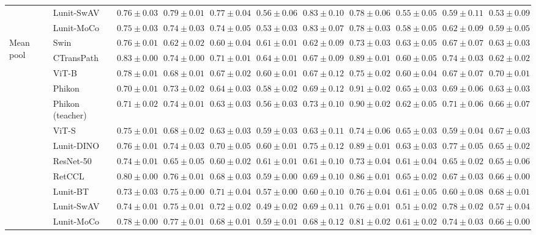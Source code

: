 \begin{tabular}{ll|cccc|c|cccc}
 & Lunit-SwAV & $0.76 \pm 0.03$ & $0.79 \pm 0.01$ & $0.77 \pm 0.04$ & $0.56 \pm 0.06$ & $0.83 \pm 0.10$ & $0.78 \pm 0.06$ & $0.55 \pm 0.05$ & $0.59 \pm 0.11$ & $0.53 \pm 0.09$ \\
 & Lunit-MoCo & $0.75 \pm 0.03$ & $0.74 \pm 0.03$ & $0.74 \pm 0.05$ & $0.53 \pm 0.03$ & $0.83 \pm 0.07$ & $0.78 \pm 0.03$ & $0.58 \pm 0.05$ & $0.62 \pm 0.09$ & $0.59 \pm 0.05$ \\
\cline{1-11}
\multirow[t]{12}{*}{Mean pool} & Swin & $0.76 \pm 0.01$ & $0.62 \pm 0.02$ & $0.60 \pm 0.04$ & $0.61 \pm 0.01$ & $0.62 \pm 0.09$ & $0.73 \pm 0.03$ & $0.63 \pm 0.05$ & $0.67 \pm 0.07$ & $0.63 \pm 0.03$ \\
 & CTransPath & $\mathbf{0.83 \pm 0.00}$ & $0.74 \pm 0.00$ & $0.71 \pm 0.01$ & $\mathbf{0.64 \pm 0.01}$ & $0.67 \pm 0.09$ & $0.89 \pm 0.01$ & $0.60 \pm 0.05$ & $0.74 \pm 0.03$ & $0.62 \pm 0.02$ \\
 & ViT-B & $0.78 \pm 0.01$ & $0.68 \pm 0.01$ & $0.67 \pm 0.02$ & $0.60 \pm 0.01$ & $0.67 \pm 0.12$ & $0.75 \pm 0.02$ & $0.60 \pm 0.04$ & $0.67 \pm 0.07$ & $\mathbf{0.70 \pm 0.01}$ \\
 & Phikon & $0.70 \pm 0.01$ & $0.73 \pm 0.02$ & $0.64 \pm 0.03$ & $0.58 \pm 0.02$ & $0.69 \pm 0.12$ & $\mathbf{0.91 \pm 0.02}$ & $\mathbf{0.65 \pm 0.03}$ & $0.69 \pm 0.06$ & $0.63 \pm 0.03$ \\
 & Phikon (teacher) & $0.71 \pm 0.02$ & $0.74 \pm 0.01$ & $0.63 \pm 0.03$ & $0.56 \pm 0.03$ & $0.73 \pm 0.10$ & $0.90 \pm 0.02$ & $0.62 \pm 0.05$ & $0.71 \pm 0.06$ & $0.66 \pm 0.07$ \\
 & ViT-S & $0.75 \pm 0.01$ & $0.68 \pm 0.02$ & $0.63 \pm 0.03$ & $0.59 \pm 0.03$ & $0.63 \pm 0.11$ & $0.74 \pm 0.06$ & $0.65 \pm 0.03$ & $0.59 \pm 0.04$ & $0.67 \pm 0.03$ \\
 & Lunit-DINO & $0.76 \pm 0.01$ & $0.74 \pm 0.03$ & $0.70 \pm 0.05$ & $0.60 \pm 0.01$ & $\mathbf{0.75 \pm 0.12}$ & $0.89 \pm 0.01$ & $0.63 \pm 0.03$ & $0.77 \pm 0.05$ & $0.65 \pm 0.02$ \\
 & ResNet-50 & $0.74 \pm 0.01$ & $0.65 \pm 0.05$ & $0.60 \pm 0.02$ & $0.61 \pm 0.01$ & $0.61 \pm 0.10$ & $0.73 \pm 0.04$ & $0.61 \pm 0.04$ & $0.65 \pm 0.02$ & $0.65 \pm 0.06$ \\
 & RetCCL & $0.80 \pm 0.00$ & $0.76 \pm 0.01$ & $0.68 \pm 0.03$ & $0.59 \pm 0.00$ & $0.69 \pm 0.10$ & $0.86 \pm 0.01$ & $0.65 \pm 0.02$ & $0.67 \pm 0.03$ & $0.66 \pm 0.00$ \\
 & Lunit-BT & $0.73 \pm 0.03$ & $0.75 \pm 0.00$ & $0.71 \pm 0.04$ & $0.57 \pm 0.00$ & $0.60 \pm 0.10$ & $0.76 \pm 0.04$ & $0.61 \pm 0.05$ & $0.60 \pm 0.08$ & $0.68 \pm 0.01$ \\
 & Lunit-SwAV & $0.74 \pm 0.01$ & $0.75 \pm 0.01$ & $\mathbf{0.72 \pm 0.02}$ & $0.49 \pm 0.02$ & $0.69 \pm 0.11$ & $0.76 \pm 0.01$ & $0.51 \pm 0.02$ & $\mathbf{0.78 \pm 0.02}$ & $0.57 \pm 0.04$ \\
 & Lunit-MoCo & $0.78 \pm 0.00$ & $\mathbf{0.77 \pm 0.01}$ & $0.68 \pm 0.01$ & $0.59 \pm 0.01$ & $0.68 \pm 0.12$ & $0.81 \pm 0.02$ & $0.61 \pm 0.02$ & $0.74 \pm 0.03$ & $0.66 \pm 0.00$ \\
\cline{1-11}
\bottomrule
\end{tabular}
